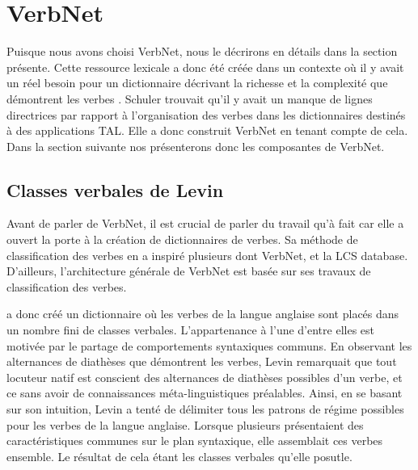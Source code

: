 
\section{VerbNet}

Puisque nous avons choisi VerbNet, nous le décrirons en détails dans la section présente. Cette ressource lexicale a donc été créée dans un contexte où il y avait un réel besoin pour un dictionnaire décrivant la richesse et la complexité que démontrent les verbes \citep{KipperClassBasedConstructionVerb2000}. Schuler trouvait qu'il y avait un manque de lignes directrices par rapport à l'organisation des verbes dans les dictionnaires destinés à des applications \ac{TAL}. Elle a donc construit VerbNet en tenant compte de cela. Dans la section suivante nos présenterons donc les composantes de VerbNet. 

\subsection{Classes verbales de Levin}

Avant de parler de VerbNet, il est crucial de parler du travail qu'à fait \cite{verb-classes.levin.1993} car elle a ouvert la porte à la création de dictionnaires de verbes. Sa méthode de classification des verbes en a inspiré plusieurs dont VerbNet\cite{SchulerVerbnetBroadcoverageComprehensive2005}, et la LCS database\citep{AyanGeneratingParsingLexicon2002a}\citep{DorrUseLexicalSemantics1992}. D'ailleurs, l'architecture générale de VerbNet est basée sur ses travaux de classification des verbes.

\cite{verb-classes.levin.1993} a donc créé un dictionnaire où les verbes de la langue anglaise sont placés dans un nombre fini de classes verbales. L'appartenance à l'une d'entre elles est motivée par le partage de comportements syntaxiques communs. En observant les alternances de diathèses que démontrent les verbes, Levin remarquait que tout locuteur natif est conscient des alternances de diathèses possibles d'un verbe, et ce sans avoir de connaissances méta-linguistiques préalables. Ainsi, en se basant sur son intuition, Levin a tenté de délimiter tous les patrons de régime possibles pour les verbes de la langue anglaise. Lorsque plusieurs présentaient des caractéristiques communes sur le plan syntaxique, elle assemblait ces verbes ensemble. Le résultat de cela étant les classes verbales qu'elle posutle.

